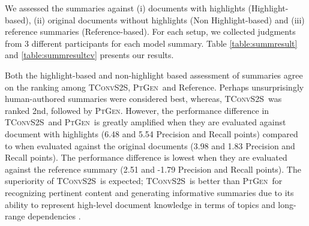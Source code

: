 \documentclass[11pt,a4paper]{article}
\newcommand\todo[1]{{\textcolor{red}{todo: #1}}}
\newcommand\ptgen{\textsc{PtGen}}
\newcommand\tconv{\textsc{TConvS2S}}
\begin{document}
We assessed the %
summaries against (i) documents with highlights (Highlight-based), (ii) original documents without highlights (Non Highlight-based) and (iii) reference summaries (Reference-based). For each setup, we collected judgments from 3 different participants for each model summary. Table \ref{table:summresult} and \ref{table:summresultcv} presents our results.


Both the highlight-based and non-highlight based assessment of summaries agree on the ranking among \tconv, \ptgen\ and Reference. Perhaps unsurprisingly human-authored summaries were considered best, whereas, \tconv\ was ranked 2nd, followed by \ptgen. However, the performance difference in \tconv\ and \ptgen\ is greatly amplified when they are evaluated against document with highlights (6.48 and 5.54 Precision and Recall points) compared to when evaluated against the original documents (3.98 and 1.83 Precision and Recall points). The performance difference is lowest when they are evaluated against the reference summary (2.51 and -1.79 Precision and Recall points). The superiority of \tconv\ is expected; \tconv\ is better than \ptgen\ for recognizing pertinent content and generating informative summaries due to its ability to represent high-level document knowledge in terms of topics and long-range dependencies \citep{narayan18xsum}.

\end{document}
